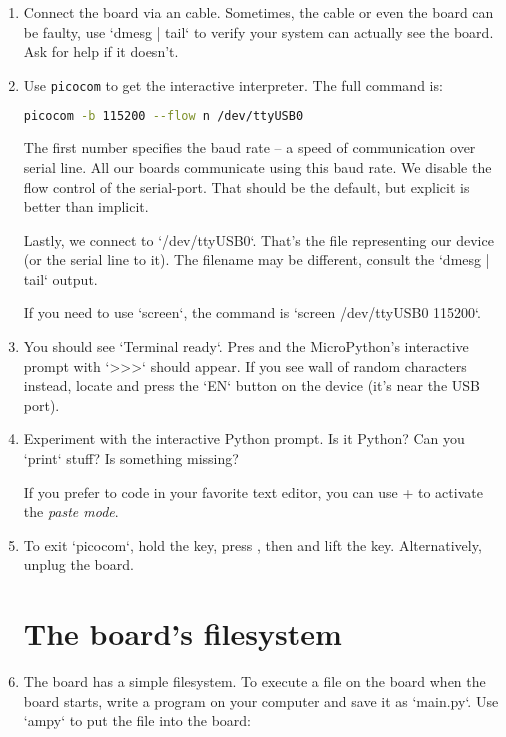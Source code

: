 \documentclass{../tutorial}
\begin{document}
\begin{enumerate}
\item
    Connect the  board via an  cable.
    Sometimes, the cable or even the board can be faulty,
    use `dmesg | tail` to verify your system can actually see the board.
    Ask for help if it doesn't.

\item
    Use \texttt{picocom} to get the interactive interpreter.
    The full command is:

    \begin{lstlisting}[language=bash]
    picocom -b 115200 --flow n /dev/ttyUSB0
    \end{lstlisting}

    The first number specifies the baud rate -- a speed of communication over serial line.
    All our  boards communicate using this baud rate.
    We disable the flow control of the serial-port.
    That should be the default,
    but explicit is better than implicit.

    Lastly, we connect to `/dev/ttyUSB0`.
    That's the file representing our device (or the serial line to it).
    The filename may be different, consult the `dmesg | tail` output.

    If you need to use `screen`,
    the command is `screen /dev/ttyUSB0 115200`.

\item
    You should see `Terminal ready`.
    Pres  and the MicroPython's interactive prompt with `>>>` should appear.
    If you see wall of random characters instead,
    locate and press the `EN` button on the device
    (it's near the USB port).

\item
    Experiment with the interactive Python prompt. Is it Python?
    Can you `print` stuff? Is something missing?

    If you prefer to code in your favorite text editor,
    you can use + to activate the \emph{paste mode}.

\item
    To exit `picocom`, hold the  key, press ,
    then  and lift the  key.
    Alternatively, unplug the board.

\section{The board's filesystem}

\item
    The board has a simple filesystem.
    To execute a file on the board when the board starts,
    write a program on your computer and save it as `main.py`.
    Use `ampy` to put the file into the board:


\end{enumerate}
\end{document}
